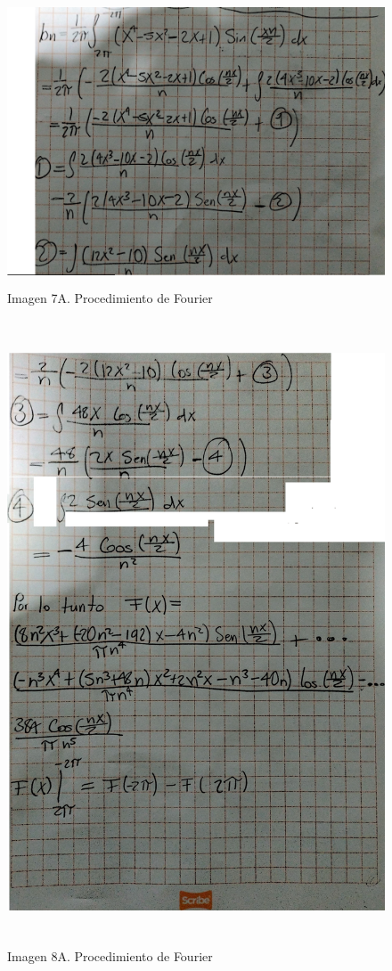 \begin{figure}[H]
	\centering
	\includegraphics[width=4.74479in,height=3.37337in]{media/image47.png}
	\caption{Imagen 7A. Procedimiento de Fourier}
\end{figure}

\begin{figure}[H]
	\centering
	\includegraphics[width=4.94271in,height=7.29091in]{media/image53.png}
	\caption{Imagen 8A. Procedimiento de Fourier}
\end{figure}

